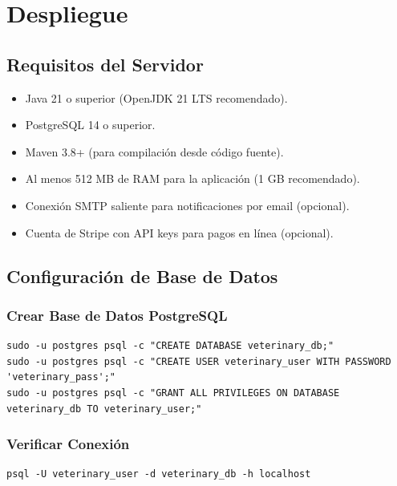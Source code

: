 \chapter{Despliegue}

\section{Requisitos del Servidor}

\begin{itemize}
    \item Java 21 o superior (OpenJDK 21 LTS recomendado).
    \item PostgreSQL 14 o superior.
    \item Maven 3.8+ (para compilaci\'on desde c\'odigo fuente).
    \item Al menos 512 MB de RAM para la aplicaci\'on (1 GB recomendado).
    \item Conexi\'on SMTP saliente para notificaciones por email (opcional).
    \item Cuenta de Stripe con API keys para pagos en l\'inea (opcional).
\end{itemize}

\section{Configuraci\'on de Base de Datos}

\subsection{Crear Base de Datos PostgreSQL}

\begin{lstlisting}[caption=Creaci\'on de base de datos y usuario en PostgreSQL]
sudo -u postgres psql -c "CREATE DATABASE veterinary_db;"
sudo -u postgres psql -c "CREATE USER veterinary_user WITH PASSWORD 'veterinary_pass';"
sudo -u postgres psql -c "GRANT ALL PRIVILEGES ON DATABASE veterinary_db TO veterinary_user;"
\end{lstlisting}

\subsection{Verificar Conexi\'on}

\begin{lstlisting}[caption=Verificar que la base de datos es accesible]
psql -U veterinary_user -d veterinary_db -h localhost
\end{lstlisting}

